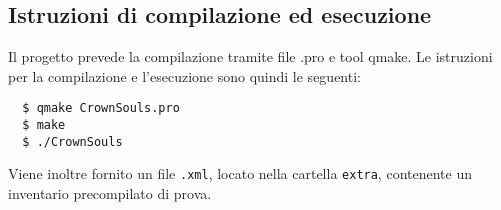 \subsection{Istruzioni di compilazione ed esecuzione}
Il progetto prevede la compilazione tramite file .pro e tool qmake. Le istruzioni per la compilazione e l'esecuzione sono quindi le seguenti:
\begin{center}
\centering
\begin{verbatim}
  $ qmake CrownSouls.pro
  $ make
  $ ./CrownSouls
\end{verbatim}
\end{center}

Viene inoltre fornito un file \texttt{.xml}, locato nella cartella \texttt{extra}, contenente un inventario precompilato di prova.

